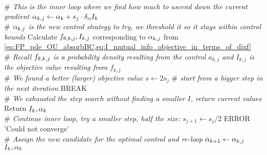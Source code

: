 \documentclass[12pt]{article}
\begin{document}
\begin{algorithm}                     
\begin{algorithmic} [1]              
	\\ {\itshape $\#$ This is the inner loop where we find how much to ascend down
	the current gradient}
	\State ${\alpha}_{k,j} \gets {\alpha}_{k} + s_j \cdot \delta_{\alpha} I_k  $
	\\ {\itshape $\#$ ${\alpha}_{k,j}$ is the new control strategy to try, we threshold
	it so it stays within control bounds}
	 \State Calculate $f_{{\theta},k,j}, I_{k,j}$
	corresponding to ${\alpha}_{k,j}$ from
		\cref{eq:FP_pde_OU_absorbBC,eq:I_mutual_info_objective_in_terms_of_dixf}
		\\ {\itshape $\#$ Recall $f_{{\theta},k,j}$ is a probability density resulting from
		the control $a_{k,j}$ and $I_{k,j}$ is the objective value resulting from $f_{k,j}$}
		\\ {\itshape $\#$ We found a better (larger) objective value}
		\State $s \gets 2 s_j$ {\itshape $\#$ start from a bigger step in the
		next iteration}
		\State BREAK
		\EndIf
		\\ {\itshape $\#$ We exhausted the step search without finding a 
		smaller $I$, return current values}
		\State Return $I_k, {\alpha}_k$
	\EndIf
 	\\ {\itshape  $ \#$ Continue inner loop, try a smaller step, half the size:}
	 	\State $s_{j+1}  \gets  s_j / 2$
		\State ERROR 'Could not converge'
	\EndIf
    \\{\itshape $\#$ Assign the new candidate for the optimal control and
    re-loop}
		\State ${\alpha}_{k+1} \gets {\alpha}_{k,j}$
\State \Return $I_k, {\alpha}_k$
\end{algorithmic}
\end{algorithm}

\clearpage
\end{document}
